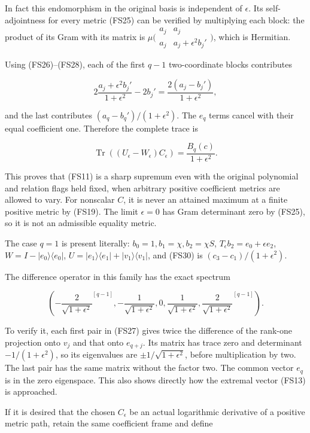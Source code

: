 \documentclass{article}
\begin{document}
In fact this endomorphism in the original basis is independent of \(\epsilon\). Its self-adjointness for every metric (FS25) can be verified by multiplying each block: the product of its Gram with its matrix is \(\mu\bigl(\begin{smallmatrix}a_j&a_j\\a_j&a_j+\epsilon^2 b_j'\end{smallmatrix}\bigr)\), which is Hermitian.

Using (FS26)--(FS28), each of the first \(q-1\) two-coordinate blocks contributes

\[
2\frac{a_j+\epsilon^2b_j'}{1+\epsilon^2}-2b_j'
=\frac{2(a_j-b_j')}{1+\epsilon^2},
\]

and the last contributes \((a_q-b_q')/(1+\epsilon^2)\). The \(e_q\) terms cancel with their equal coefficient one. Therefore the complete trace is

\[
\boxed{
\operatorname{Tr}((U_\epsilon-W_\epsilon)C_\epsilon)
=\frac{B_q(c)}{1+\epsilon^2}.
}
\tag{FS30}
\]

This proves that (FS11) is a sharp supremum even with the original polynomial and relation flags held fixed, when arbitrary positive coefficient metrics are allowed to vary. For nonscalar \(C\), it is never an attained maximum at a finite positive metric by (FS19). The limit \(\epsilon=0\) has Gram determinant zero by (FS25), so it is not an admissible equality metric.

The case \(q=1\) is present literally: \(b_0=1,b_1=\chi,b_2=\chi S\), \(T_\epsilon b_2=e_0+\epsilon e_2\), \(W=I-|e_0\rangle\langle e_0|\), \(U=|e_1\rangle\langle e_1|+|v_1\rangle\langle v_1|\), and (FS30) is \((c_3-c_1)/(1+\epsilon^2)\).

The difference operator in this family has the exact spectrum

\[
\left(
-\frac2{\sqrt{1+\epsilon^2}}^{[q-1]},
-\frac1{\sqrt{1+\epsilon^2}},0,
\frac1{\sqrt{1+\epsilon^2}},
\frac2{\sqrt{1+\epsilon^2}}^{[q-1]}
\right).
\tag{FS31}
\]

To verify it, each first pair in (FS27) gives twice the difference of the rank-one projection onto \(v_j\) and that onto \(e_{q+j}\). Its matrix has trace zero and determinant \(-1/(1+\epsilon^2)\), so its eigenvalues are \(\pm1/\sqrt{1+\epsilon^2}\), before multiplication by two. The last pair has the same matrix without the factor two. The common vector \(e_q\) is in the zero eigenspace. This also shows directly how the extremal vector (FS13) is approached.

If it is desired that the chosen \(C_\epsilon\) be an actual logarithmic derivative of a positive metric path, retain the same coefficient frame and define
\end{document}
